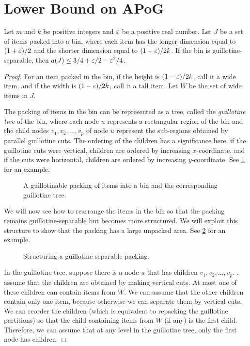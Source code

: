 \section{Lower Bound on APoG}
\label{sec:apog-lb}

\begin{lemma}
\label{thm:guill-hardex-area}
Let $m$ and $k$ be positive integers and $\varepsilon$ be a positive real number.
Let $J$ be a set of items packed into a bin, where each item has the longer dimension
equal to $(1+\varepsilon)/2$ and the shorter dimension equal to $(1-\varepsilon)/2k$.
If the bin is guillotine-separable, then $a(J) \le 3/4 + \varepsilon/2 - \varepsilon^2/4$.
\end{lemma}
\begin{proof}
For an item packed in the bin, if the height is $(1-\varepsilon)/2k$, call it a wide item,
and if the width is $(1-\varepsilon)/2k$, call it a tall item.
Let $W$ be the set of wide items in $J$.

The packing of items in the bin can be represented as a tree,
called the \emph{guillotine tree} of the bin,
where each node $u$ represents a rectangular region of the bin
and the child nodes $v_1, v_2, \ldots, v_p$ of node $u$
represent the sub-regions obtained by parallel guillotine cuts.
The ordering of the children has a significance here:
if the guillotine cuts were vertical, children are ordered by increasing $x$-coordinate,
and if the cuts were horizontal, children are ordered by increasing $y$-coordinate.
See \cref{fig:guill-tree} for an example.

\begin{figure}[htb]
\centering

\caption{A guillotinable packing of items into a bin and the corresponding
guillotine tree.}
\label{fig:guill-tree}
\end{figure}

We will now see how to rearrange the items in the bin so that the packing remains
guillotine-separable but becomes more structured.
We will exploit this structure to show that the packing has a large unpacked area.
See \cref{fig:shift-thin} for an example.

\begin{figure}[htb]
\centering

\caption{Structuring a guillotine-separable packing.}
\label{fig:shift-thin}
\end{figure}

In the guillotine tree, suppose there is a node $u$
that has children $v_1, v_2, \ldots, v_p$.
\WLoG, assume that the children are obtained by making vertical cuts.
At most one of these children can contain items from $W$.
We can assume \wLoG{} that the other children contain only one item,
because otherwise we can separate them by vertical cuts.
We can reorder the children (which is equivalent to repacking the guillotine partitions)
so that the child containing items from $W$ (if any) is the first child.
Therefore, we can assume \wLoG{} that at any level in the guillotine tree,
only the first node has children.


\end{proof}
